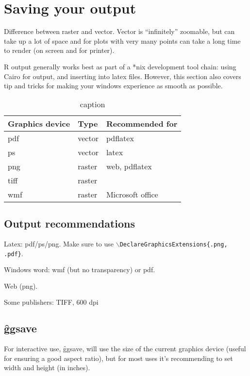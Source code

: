 % 

\section{Saving your output}
\label{sec:saving}

Difference between raster and vector.  Vector is ``infinitely'' zoomable, but can take up a lot of space and for plots with very many points can take a long time to render (on screen and for printer).

R output generally works best as part of a *nix development tool chain: using Cairo for output, and inserting into latex files.  However, this section also covers tip and tricks for making your windows experience as smooth as possible.

\begin{table}
  \begin{center}
  \begin{tabular}{lll}
    \toprule
    Graphics device & Type & Recommended for \\
    \midrule
    pdf   & vector & pdflatex\\
    ps    & vector & latex \\
    png   & raster & web, pdflatex \\
    tiff  & raster & \\
    wmf   & raster & Microsoft office \\
    \bottomrule 
  \end{tabular}
  \end{center}
  \caption{caption}
  \label{label}
\end{table}

\subsection{Output recommendations}
\label{sub:output_recommendations}

Latex: pdf/ps/png.  Make sure to use \texttt{$\backslash$DeclareGraphicsExtensions\{.png, .pdf\}}.  

Windows word: wmf (but no transparency) or pdf.

Web (png).  

Some publishers: TIFF, 600 dpi

\subsection{\f{ggsave}}
\label{sub:ggsave}

For interactive use, \f{ggsave}, will use the size of the current graphics device (useful for ensuring a good aspect ratio), but for most uses it's recommending to set width and height (in inches).



